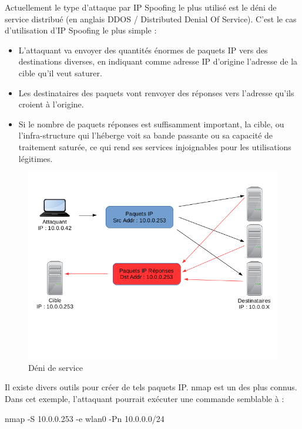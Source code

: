 Actuellement le type d'attaque par IP Spoofing le plus utilisé est le déni de service distribué (en anglais DDOS / Distributed Denial Of Service). C'est le cas d'utilisation d'IP Spoofing le plus simple :\\
\begin{itemize}
\item L'attaquant va envoyer des quantités énormes de paquets IP vers des destinations diverses, en indiquant comme adresse IP d'origine l'adresse de la cible qu'il veut saturer.
\item Les destinataires des paquets vont renvoyer des réponses vers l'adresse qu'ils croient à l'origine.
\item Si le nombre de paquets réponses est suffisamment important, la cible, ou l'infra-structure qui l'héberge voit sa bande passante ou sa capacité de traitement saturée, ce qui rend ses services injoignables pour les utilisations légitimes.
\end{itemize}

\begin{figure}[hbtp]
\caption{Déni de service}
\centering
\includegraphics[scale=1]{../images/ip-spoofing-ddos.png}
\end{figure}

\begin{tabbing}
\end{tabbing}
Il existe divers outils pour créer de tels paquets IP. nmap est un des plus connus. Dans cet exemple, l'attaquant pourrait exécuter une commande semblable à :\\
\begin{center}
nmap -S 10.0.0.253 -e wlan0 -Pn 10.0.0.0/24
\end{center}


